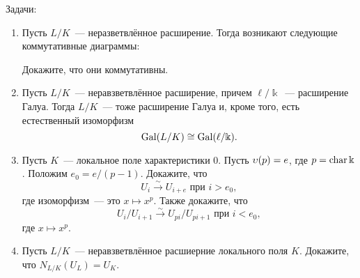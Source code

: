 	 \begin{homework}
	 	Задачи: 
	 	\begin{enumerate}
	 		\item Пусть $L/K$~--- неразветвлённое расширение. Тогда возникают следующие коммутативные диаграммы: 


	 		Докажите, что они коммутативны. 

	 		\item Пусть $L/K$~--- неравзветвлённое расширение, причем $\ell/\Bbbk$~--- расширение Галуа. Тогда $L/K$~--- тоже расширение Галуа и, кроме того, есть естественный изоморфизм 
	 		\[
	 			\operatorname{Gal}(L/K) \cong \operatorname{Gal}(\ell/\Bbbk).
	 		\]


	 		\item Пусть $K$~--- локальное поле характеристики $0$. Пусть $\upsilon(p) = e$, где $p = \operatorname{char}{\Bbbk}$. Положим $e_0 = e / (p - 1)$. Докажите, что 
	 		\[
	 			U_i \xrightarrow{\sim} U_{i + e} \text{ при } i > e_0,
	 		\]
	 		где изоморфизм~--- это $x \mapsto x^p$. Также докажите, что 
	 		\[
	 			U_i/U_{i + 1 } \xrightarrow{\sim} U_{p i}/U_{pi + 1} \text{ при } i < e_0,
	 		\]
	 		где $x \mapsto x^p$.

	 		\item Пусть $L/K$~--- неравзветвлённое расшиерние локального поля $K$. Докажите, что $N_{L/K}(U_L) = U_K$.
	 	\end{enumerate}
	 \end{homework}
	 


